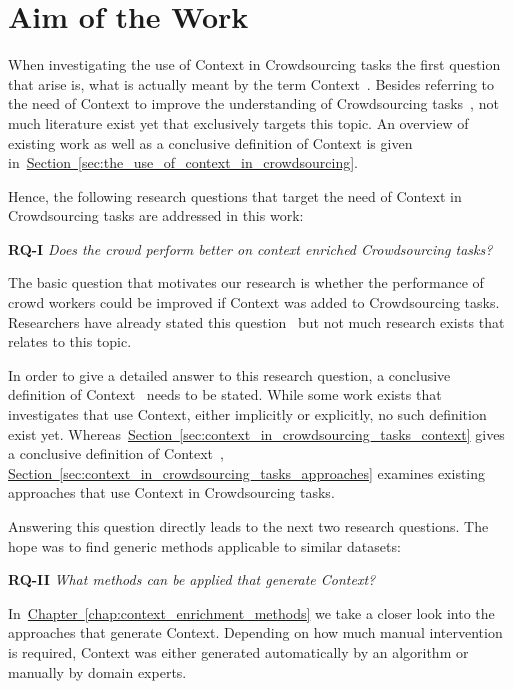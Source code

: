 \section{Aim of the Work}
When investigating the use of Context in Crowdsourcing tasks the first question that arise is, what is actually
meant by the term \guillemotright Context\guillemotleft~. Besides referring to the need of Context to improve the understanding
of Crowdsourcing tasks~\cite{sarasua2015crowdsourcing}, not much literature exist yet that exclusively targets this topic. An overview
of existing work as well as a conclusive definition of Context is given in~\hyperref[sec:the_use_of_context_in_crowdsourcing]{Section~\ref*{sec:the_use_of_context_in_crowdsourcing}}.

Hence, the following research questions that target the need of Context in Crowdsourcing tasks are addressed in this work:

\textbf{RQ-I} \emph{Does the crowd perform better on context enriched Crowdsourcing tasks?}

The basic question that motivates our research is whether the performance of crowd workers could be improved if Context was added
to Crowdsourcing tasks. Researchers have already stated this question~\cite{sarasua2015crowdsourcing} but not much research exists that relates to this topic. 

In order to give a detailed answer to this research question, a conclusive definition of \guillemotright Context\guillemotleft~ needs to be stated. While some work exists that investigates that use Context, either implicitly or explicitly, no such definition exist yet. Whereas~\hyperref[sec:context_in_crowdsourcing_tasks_context]{Section~\ref*{sec:context_in_crowdsourcing_tasks_context}} gives a conclusive definition of \guillemotright Context\guillemotleft~, \hyperref[sec:context_in_crowdsourcing_tasks_approaches]{Section~\ref*{sec:context_in_crowdsourcing_tasks_approaches}} examines existing approaches that use Context in Crowdsourcing tasks. 

Answering this question directly leads to the next two research questions. The hope was to find generic methods applicable to similar
datasets:

\textbf{RQ-II} \emph{What methods can be applied that generate Context?}

In~\hyperref[chap:context_enrichment_methods]{Chapter~\ref*{chap:context_enrichment_methods}} we take a closer look into the approaches that generate Context. Depending on how much manual intervention is required, Context was either generated automatically by an algorithm or manually by domain experts. 

